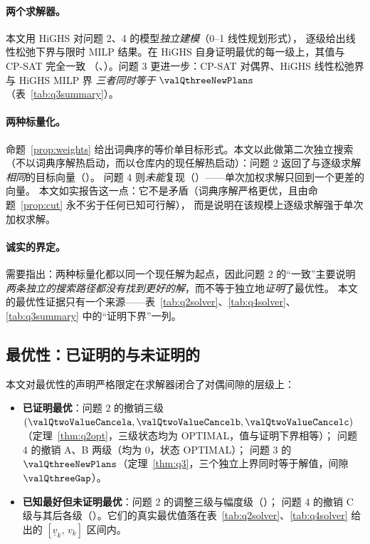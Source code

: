 \paragraph{两个求解器。}本文用 HiGHS\cite{huangfu2018} 对问题 2、4 的模型\emph{独立建模}（0--1 线性规划形式），
逐级给出线性松弛下界与限时 MILP 结果。在 HiGHS 自身证明最优的每一级上，其值与 CP-SAT 完全一致
（\valQtwoHighsAgree{}、\valQfourHighsAgree{}）。问题 3 更进一步：CP-SAT 对偶界、HiGHS 线性松弛界与 HiGHS MILP 界%
\emph{三者同时等于} $\valQthreeNewPlans$（表~\ref{tab:q3summary}）。

\paragraph{两种标量化。}命题~\ref{prop:weights} 给出词典序的等价单目标形式。本文以此做第二次独立搜索
（不以词典序解热启动，而以仓库内的现任解热启动）：问题 2 返回了与逐级求解\emph{相同}的目标向量（\valQtwoWeightedAgree{}）。
问题 4 则\emph{未能}复现（\valQfourWeightedAgree{}）——单次加权求解只回到一个更差的向量。
本文如实报告这一点：它不是矛盾（词典序解严格更优，且由命题~\ref{prop:cut} 永不劣于任何已知可行解），
而是说明在该规模上逐级求解强于单次加权求解。

\paragraph{诚实的界定。}需要指出：两种标量化都以同一个现任解为起点，因此问题 2 的“一致”主要说明%
\emph{两条独立的搜索路径都没有找到更好的解}，而不等于独立地\emph{证明}了最优性。
本文的最优性证据只有一个来源——表~\ref{tab:q2solver}、\ref{tab:q4solver}、\ref{tab:q3summary} 中的“证明下界”一列。

\subsection{最优性：已证明的与未证明的}

本文对最优性的声明严格限定在求解器闭合了对偶间隙的层级上：

\begin{itemize}[leftmargin=1.6em,itemsep=0.2em]
  \item \textbf{已证明最优}：问题 2 的撤销三级 $(\valQtwoValueCancela,\valQtwoValueCancelb,\valQtwoValueCancelc)$
        （定理~\ref{thm:q2opt}，三级状态均为 \textsf{OPTIMAL}，值与证明下界相等）；
        问题 4 的撤销 A、B 两级（均为 $0$，状态 \textsf{OPTIMAL}）；
        问题 3 的 $\valQthreeNewPlans$（定理~\ref{thm:q3}，三个独立上界同时等于解值，间隙 $\valQthreeGap$）。
  \item \textbf{已知最好但未证明最优}：问题 2 的调整三级与幅度级（\valQtwoAllOptimal{}）；
        问题 4 的撤销 C 级与其后各级（\valQfourAllOptimal{}）。它们的真实最优值落在表~\ref{tab:q2solver}、\ref{tab:q4solver}
        给出的 $[\underline{v}_k,\,v_k]$ 区间内。
\end{itemize}

